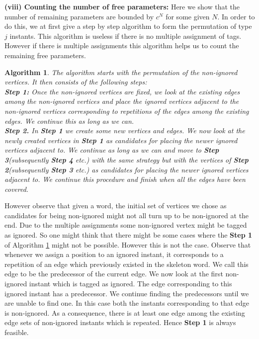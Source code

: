 \documentclass[12pt]{article}
\numberwithin{equation}{section}
\newtheorem{algorithm}{Algorithm}[section]
\numberwithin{equation}{section}
\theoremstyle{definition}
\renewcommand{\1}{\bf 1}
\begin{document}
\noindent
\textbf{(viii) Counting the number of free parameters:}
Here we show that the number of remaining parameters are bounded by $c^{N}$ for some given $N$. In order to do this, we at first give a step by step algorithm to form the permutation of type $j$ instants. This algorithm is useless if there is no multiple assignment of tags. However if there is multiple assignments this algorithm helps us to count the remaining free parameters.
\begin{algorithm}\label{alg:freeparameter}
The algorithm starts with the permutation of the non-ignored vertices. It then consists of the following steps:\\
\textbf{Step 1:} Once the non-ignored vertices are fixed, we look at the existing edges among the non-ignored vertices and place the ignored vertices   adjacent to the non-ignored vertices corresponding to repetitions of the edges among the existing edges. We continue this as long as we can.\\
\textbf{Step 2.} In \textbf{Step 1} we create some new vertices and edges. We now look at the newly created vertices in \textbf{Step 1} as candidates for placing the newer ignored vertices adjacent to. We continue as long as we can and move to \textbf{Step 3}(subsequently \textbf{Step 4} etc.) with the same strategy but with the vertices of \textbf{Step 2}(subsequently \textbf{Step 3} etc.) as candidates for placing the newer ignored vertices adjacent to. We continue this procedure and finish when all the edges have been covered.
\end{algorithm}
However observe that given a word, the initial set of vertices we chose as candidates for being non-ignored might not all turn up to be non-ignored at the end. Due to the multiple assignments some non-ignored vertex might be tagged as ignored. So one might think that there might be some cases where the \textbf{Step 1} of Algorithm \ref{alg:freeparameter} might not be possible. However this is not the case. Observe that whenever we assign a position to an ignored instant, it corresponds to a repetition of an edge which previously existed in the skeleton word. We call this edge to be the predecessor of the current edge. We now look at the first non-ignored instant which is tagged as ignored. The edge corresponding to this ignored instant has a predecessor. We continue finding the predecessors until we are unable to find one. In this case both the instants corresponding to that edge is non-ignored. As a consequence, there is at least one edge among the existing edge sets of non-ignored instants which is repeated. Hence \textbf{Step 1} is always feasible.
\end{document}
